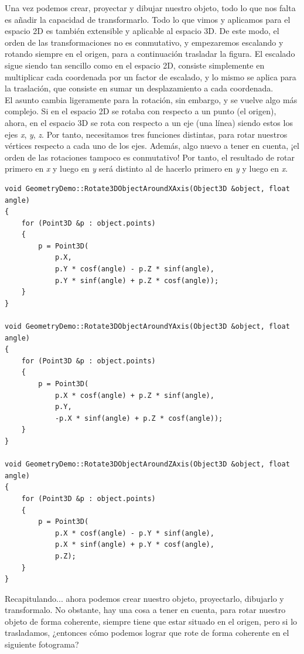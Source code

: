 Una vez podemos crear, proyectar y dibujar nuestro objeto, todo lo que nos falta es añadir la capacidad de transformarlo. Todo lo que vimos y aplicamos para el espacio 2D es también extensible y aplicable al espacio 3D. De este modo, el orden de las transformaciones no es conmutativo, y empezaremos escalando y rotando siempre en el origen, para a continuación trasladar la figura. El escalado sigue siendo tan sencillo como en el espacio 2D, consiste simplemente en multiplicar cada coordenada por un factor de escalado, y lo mismo se aplica para la traslación, que consiste en sumar un desplazamiento a cada coordenada.\\

El asunto cambia ligeramente para la rotación, sin embargo, y se vuelve algo más complejo. Si en el espacio 2D se rotaba con respecto a un punto (el origen), ahora, en el espacio 3D se rota con respecto a un eje (una línea) siendo estos los ejes \emph{x}, \emph{y}, \emph{z}. Por tanto, necesitamos tres funciones distintas, para rotar nuestros vértices respecto a cada uno de los ejes. Además, algo nuevo a tener en cuenta, ¡el orden de las rotaciones tampoco es conmutativo! Por tanto, el resultado de rotar primero en \emph{x} y luego en \emph{y} será distinto al de hacerlo primero en \emph{y} y luego en \emph{x}.\\

\begin{lstlisting}[style=C-color, caption={Métodos para rotar en torno a los ejes, en el espacio 3D}, label=cod:rotatearoundaxes]
void GeometryDemo::Rotate3DObjectAroundXAxis(Object3D &object, float angle)
{
    for (Point3D &p : object.points)
    {
        p = Point3D(
            p.X,
            p.Y * cosf(angle) - p.Z * sinf(angle),
            p.Y * sinf(angle) + p.Z * cosf(angle));
    }
}

void GeometryDemo::Rotate3DObjectAroundYAxis(Object3D &object, float angle)
{
    for (Point3D &p : object.points)
    {
        p = Point3D(
            p.X * cosf(angle) + p.Z * sinf(angle),
            p.Y,
            -p.X * sinf(angle) + p.Z * cosf(angle));
    }
}

void GeometryDemo::Rotate3DObjectAroundZAxis(Object3D &object, float angle)
{
    for (Point3D &p : object.points)
    {
        p = Point3D(
            p.X * cosf(angle) - p.Y * sinf(angle),
            p.X * sinf(angle) + p.Y * cosf(angle),
            p.Z);
    }
}
\end{lstlisting}

Recapitulando... ahora podemos crear nuestro objeto, proyectarlo, dibujarlo y transformalo. No obstante, hay una cosa a tener en cuenta, para rotar nuestro objeto de forma coherente, siempre tiene que estar situado en el origen, pero si lo trasladamos, ¿entonces cómo podemos lograr que rote de forma coherente en el siguiente fotograma?\\

